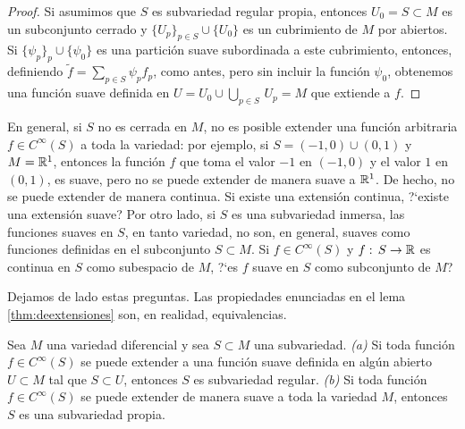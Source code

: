 \begin{proof}
	Si asumimos que $S$ es subvariedad regular propia, entonces
	$U_{0}=S\subset M$ es un subconjunto cerrado y
	$\{U_{p}\}_{p\in S}\cup\{U_{0}\}$ es un cubrimiento de $M$ por
	abiertos. Si $\{\psi_{p}\}_{p}\cup\{\psi_{0}\}$ es una partici\'{o}n
	suave subordinada a este cubrimiento, entonces, definiendo
	$\tilde{f}=\sum_{p\in S}\psi_{p}f_{p}$, como antes, pero sin
	incluir la funci\'{o}n $\psi_{0}$, obtenemos una funci\'{o}n
	suave definida en $U=U_{0}\cup\bigcup_{p\in S}\,U_{p}=M$ que
	extiende a $f$.
\end{proof}

En general, si $S$ no es cerrada en $M$, no es posible extender una
funci\'{o}n arbitraria $f\in C^{\infty}(S)$ a toda la variedad: por ejemplo,
si $S=(-1,0)\cup (0,1)$ y $M=\mathbb{R}^{1}$, entonces la funci\'{o}n
$f$ que toma el valor $-1$ en $(-1,0)$ y el valor $1$ en $(0,1)$, es suave,
pero no se puede extender de manera suave a $\mathbb{R}^{1}$. De hecho, no se
puede extender de manera continua. Si existe una extensi\'{o}n continua,
?`existe una extensi\'{o}n suave? Por otro lado, si $S$ es una subvariedad
inmersa, las funciones suaves en $S$, en tanto variedad, no son, en general,
suaves como funciones definidas en el subconjunto $S\subset M$.
Si $f\in C^{\infty}(S)$ y $f:\,S\rightarrow\mathbb{R}$ es continua en $S$ como
subespacio de $M$, ?`es $f$ suave en $S$ como subconjunto de $M$?

Dejamos de lado estas preguntas. Las propiedades enunciadas en el lema
\ref{thm:deextensiones} son, en realidad, equivalencias.

\begin{propoDeNoExtensiones}\label{thm:denoextensiones}
	Sea $M$ una variedad diferencial y sea $S\subset M$ una subvariedad.
	\emph{(a)} Si toda funci\'{o}n $f\in C^{\infty}(S)$ se puede extender
	a una funci\'{o}n suave definida en alg\'{u}n abierto
	$U\subset M$ tal que $S\subset U$, entonces $S$ es subvariedad
	regular. \emph{(b)} Si toda funci\'{o}n $f\in C^{\infty}(S)$ se puede
	extender de manera suave a toda la variedad $M$, entonces $S$
	es una subvariedad propia.
\end{propoDeNoExtensiones}

